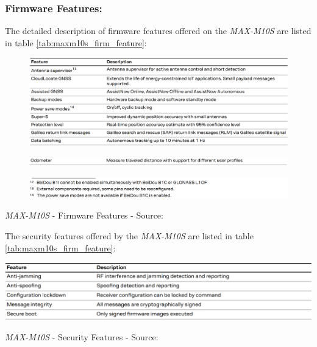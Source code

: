 \documentclass[report.tex]{subfiles}
\begin{document}
\subsubsection{Firmware Features:}
The detailed description of firmware features offered on the \textit{MAX-M10S} are listed in table \ref{tab:maxm10s_firm_feature}:

\begin{table}[H]
	\centering
\begin{subfigure}{\textwidth}
	\centering
	\includegraphics[width=1\textwidth]{Include/Figure/comp/maxm10s_firm_feature.png}
\end{subfigure}
\begin{subfigure}{\textwidth}
	\centering
	\includegraphics[width=1\textwidth]{Include/Figure/comp/maxm10s_firm_feature2.png}
\end{subfigure}
\begin{subfigure}{\textwidth}
	\centering
	\includegraphics[width=1\textwidth]{Include/Figure/comp/maxm10s_firm_feature3.png}
\end{subfigure}
\caption{\textit{MAX-M10S} - Firmware Features - Source: \cite{MAXM10S}}
\label{tab:maxm10s_firm_feature}
\end{table}

The security features offered by the \textit{MAX-M10S} are listed in table \ref{tab:maxm10s_firm_feature}:

\begin{table}[H]
	\centering
	\includegraphics[width=1\textwidth]{Include/Figure/comp/maxm10s_sec_feat.png}
\caption{\textit{MAX-M10S} - Security Features - Source: \cite{MAXM10S}}
\label{tab:maxm10s_sec_feat}
\end{table}
\end{document}
